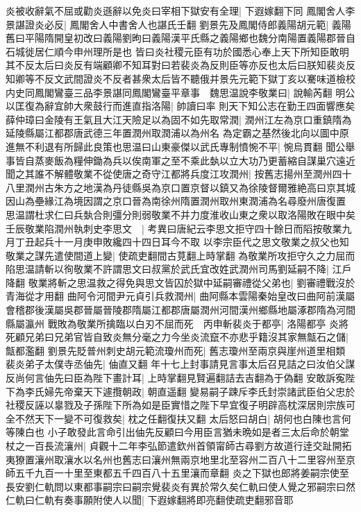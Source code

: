 炎被收辭氣不屈或勸炎遜辭以免炎曰宰相下獄安有全理|{
	下遐嫁翻下同}
鳳閣舍人李景諶證炎必反|{
	鳳閣舍人中書舍人也諶氏壬翻}
劉景先及鳳閣侍郎義陽胡元範|{
	義陽舊曰平陽隋開皇初改曰義陽劉昫曰義陽漢平氏縣之義陽鄉也魏分南陽置義陽郡晉自石城徙居仁順今申州理所是也}
皆曰炎社稷元臣有功於國悉心奉上天下所知臣敢明其不反太后曰炎反有端顧卿不知耳對曰若裴炎為反則臣等亦反也太后曰朕知裴炎反知卿等不反文武間證炎不反者甚衆太后皆不聽俄并景先元範下獄丁亥以騫味道檢校内史同鳳閣鸞臺三品李景諶同鳳閣鸞臺平章事　魏思温說李敬業曰|{
	說輸芮翻}
明公以匡復為辭宜帥大衆鼓行而進直指洛陽|{
	帥讀曰率}
則天下知公志在勤王四面響應矣薛仲璋曰金陵有王氣且大江天險足以為固不如先取常潤|{
	潤州江左為京口重鎮隋為延陵縣屬江都郡唐武德三年置潤州取潤浦以為州名}
為定霸之基然後北向以圖中原進無不利退有所歸此良策也思温曰山東豪傑以武氏專制憤惋不平|{
	惋烏貫翻}
聞公舉事皆自蒸麥飯為糧伸鋤為兵以俟南軍之至不乘此埶以立大功乃更蓄縮自謀巢穴遠近聞之其誰不解體敬業不從使唐之奇守江都將兵度江攻潤州|{
	按舊志揚州至潤州四十八里潤州古朱方之地漢為丹徒縣吳為京口置京督以鎮又為徐陵督爾雅絶高曰京其城因山為壘緣江為境因謂之京口晉為南徐州隋置潤州取州東潤浦為名尋廢州唐復置}
思温謂杜求仁曰兵埶合則彊分則弱敬業不并力度淮收山東之衆以取洛陽敗在眼中矣壬辰敬業陷潤州執刺史李思文　|{
	考異曰唐紀云李思文拒守四十餘日而䧟按敬業九月丁丑起兵十一月庚申敗纔四十四日耳今不取}
以李宗臣代之思文敬業之叔父也知敬業之謀先遣使間道上變|{
	使疏吏翻間古莧翻上時掌翻}
為敬業所攻拒守久之力屈而陷思温請斬以徇敬業不許謂思文曰叔黨於武氏宜改姓武潤州司馬劉延嗣不降|{
	江戶降翻}
敬業將斬之思温救之得免與思文皆囚於獄中延嗣審禮從父弟也|{
	劉審禮戰沒於青海從才用翻}
曲阿令河間尹元貞引兵救潤州|{
	曲阿縣本雲陽秦始皇改曰曲阿前漢屬會稽郡後漢屬吳郡晉屬晉陵郡隋屬江都郡唐屬潤州河間漢州鄉縣地屬涿郡隋為河間縣屬瀛州}
戰敗為敬業所擒臨以白刃不屈而死　丙申斬裴炎于都亭|{
	洛陽都亭}
炎將死顧兄弟曰兄弟官皆自致炎無分毫之力今坐炎流竄不亦悲乎籍沒其家無甔石之儲|{
	甔都濫翻}
劉景先貶普州刺史胡元範流瓊州而死|{
	舊志瓊州至兩京與崖州道里相類}
裴炎弟子太僕寺丞伷先|{
	伷直又翻}
年十七上封事請見言事太后召見詰之曰汝伯父謀反尚何言伷先曰臣為陛下畫計耳|{
	上時掌翻見賢遍翻詰去吉翻為于偽翻}
安敢訴寃陛下為李氏婦先帝棄天下遽攬朝政|{
	朝直遥翻}
變易嗣子踈斥李氏封崇諸武臣伯父忠於社稷反誣以辠戮及子孫陛下所為如是臣實惜之陛下早宜復子明辟高枕深居則宗族可全不然天下一變不可復救矣|{
	枕之任翻復扶又翻}
太后怒曰胡白|{
	胡何也白陳也言何等陳白也}
小子敢發此言命引出伷先反顧曰今用臣言猶未晩如是者三太后命於朝堂杖之一百長流瀼州|{
	貞觀十二年李弘節遣欽州首領甯師古尋劉方故道行逹交趾開拓夷獠置瀼州取瀼水以名州也舊志曰瀼州無兩京地里北至容州二百八十二里容州至京師五千九百一十里至東都五千四百八十五里瀼而章翻}
炎之下獄也郎將姜嗣宗使至長安劉仁軌問以東都事嗣宗曰嗣宗覺裴炎有異於常久矣仁軌曰使人覺之邪嗣宗曰然仁軌曰仁軌有奏事願附使人以聞|{
	下遐嫁翻將即亮翻使疏吏翻邪音耶}
